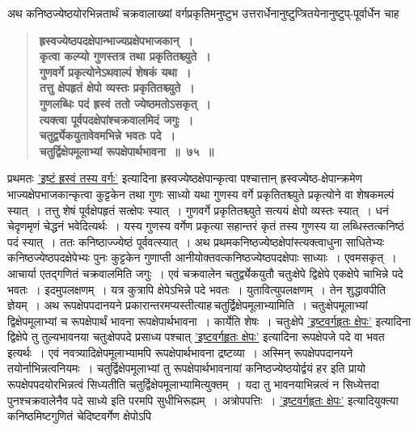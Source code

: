 \documentclass[11pt, openany]{book}
\begin{document}
\newpage

\begin{sloppypar}
{\small अथ कनिष्ठज्येष्ठयोरभिन्नतार्थं चक्रवालाख्यां वर्गप्रकृतिमनुष्टुभ उत्तरार्धेनानुष्टुप्त्रितयेनानुष्टुप्-पूर्वार्धेन चाह\textendash }

 \label{6.75}
\begin{quote}
{\large \textbf{{\color{purple}ह्रस्वज्येष्ठपदक्षेपान्भाज्यप्रक्षेपभाजकान्~।\\
कृत्वा कल्प्यो गुणस्तत्र तथा प्रकृतितश्च्युते~।\\
गुणवर्गे प्रकृत्योनेऽथवाल्पं शेषकं यथा~।\\
तत्तु क्षेपहृतं क्षेपो व्यस्तः प्रकृतितश्च्युते~।\\
गुणलब्धिः पदं ह्रस्वं ततो ज्येष्ठमतोऽसकृत्~।\\
त्यक्त्वा पूर्वपदक्षेपांश्चक्रवालमिदं जगुः~।\\
चतुर्द्व्येकयुतावेवमभिन्ने भवतः पदे~।\\
चतुर्द्विक्षेपमूलाभ्यां रूपक्षेपार्थभावना~॥~७५~॥}}}
\end{quote}

प्रथमतः \hyperref[6.70]{'इष्टं ह्रस्वं तस्य वर्गः'} इत्यादिना ह्रस्वज्येष्ठक्षेपान्कृत्वा पश्चात्तान् ह्रस्वज्येष्ठ-क्षेपान्क्रमेण भाज्यक्षेपभाजकान्कृत्वा कुट्टकेन तथा गुणः साध्यो यथा गुणस्य वर्गे प्रकृतितश्च्युते प्रकृत्योने वा शेषकमल्पं स्यात्~। तत्तु शेषं पूर्वक्षेपहृतं सत्क्षेपः स्यात्~। गुणवर्गे प्रकृतितश्च्युते सत्ययं क्षेपो व्यस्तः स्यात्~। धनं चेदृणमृणं चेद्धनं भवेदित्यर्थः~। यस्य गुणस्य वर्गेण प्रकृत्या सहान्तरं कृतं तस्य गुणस्य या लब्धिस्तत्कनिष्ठं पदं स्यात्~। ततः कनिष्ठाज्ज्येष्ठं पूर्ववत्स्यात्~। अथ प्रथमकनिष्ठज्येष्ठक्षेपांस्त्यक्त्वाधुना साधितेभ्यः कनिष्ठज्येष्ठपदक्षेपेभ्यः पुनः कुट्टकेन गुणाप्ती आनीयोक्तवत्कनिष्ठज्येष्ठपदक्षेपाः साध्याः~। एवमसकृत्~। आचार्या एतद्गणितं चक्रवालमिति जगुः~। एवं चक्रवालेन चतुर्द्व्येकयुतौ चतुःक्षेपे द्विक्षेपे एकक्षेपे चाभिन्ने पदे भवतः~। इदमुपलक्षणम्~। यत्र कुत्रापि क्षेपेऽभिन्ने पदे भवतः~। युतावित्युपलक्षणम्~। तेन शुद्धावपीति ज्ञेयम्~। अथ रूपक्षेपपदानयने प्रकारान्तरमप्यस्तीत्याह\textendash \,चतुर्द्विक्षेपमूलाभ्यामिति~। चतुःक्षेपमूलाभ्यां द्विक्षेपमूलाभ्यां च रूपक्षेपार्थं भावना रूपक्षेपार्थभावना~। कार्येति शेषः~। चतुःक्षेपे \hyperref[6.72]{'इष्टवर्गहृतः क्षेपः'} इत्यादिना द्विक्षेपे तु तुल्यभावनया चतुःक्षेपपदे प्रसाध्य पश्चात् \hyperref[6.72]{'इष्टवर्गहृतः क्षेपः'} इत्यादिना रूपक्षेपजे पदे वा भवत इत्यर्थः~। एवं नवत्र्यादिक्षेपमूलाभ्यामपि रूपक्षेपार्थभावना द्रष्टव्या~। अस्मिन् रूपक्षेपपदानयने तयोर्नाभिन्नत्वनियमः~। चतुर्द्विक्षेपमूलाभ्यां तु रूपक्षेपार्थभावनायां कनिष्ठज्येष्ठयोर्द्वयं हर इति प्रायो रूपक्षेपपदयोरभिन्नत्वं सिध्यतीति चतुर्द्विक्षेपमूलाभ्यामित्युक्तम्~। यदा तु भावनयाभिन्नत्वं न सिध्येत्तदा पुनश्चक्रवालेनैव पदे साध्ये इति परमपि सुधीभिरूह्यम्~। अत्रोपपत्तिः~। \hyperref[6.72]{'इष्टवर्गहृतः क्षेपः'} इत्यादियुक्त्या कनिष्ठमिष्टगुणितं चेदिष्टवर्गेण क्षेपोऽपि
\end{sloppypar}
\end{document}
